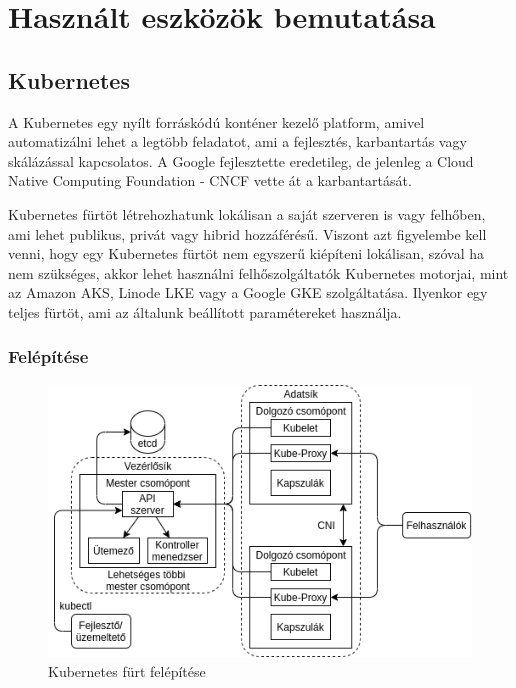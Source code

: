 \chapter{Használt eszközök bemutatása}

\section{Kubernetes}

A Kubernetes egy nyílt forráskódú konténer kezelő platform, amivel automatizálni
lehet a legtöbb feladatot, ami a fejlesztés, karbantartás vagy skálázással 
kapcsolatos. A Google fejlesztette eredetileg, de jelenleg a Cloud Native
Computing Foundation - CNCF vette át a karbantartását. 

Kubernetes fürtöt létrehozhatunk lokálisan a saját szerveren is vagy felhőben,
ami lehet publikus, privát vagy hibrid hozzáférésű. Viszont azt figyelembe 
kell venni, hogy egy Kubernetes fürtöt nem egyszerű kiépíteni lokálisan, 
szóval ha nem szükséges, akkor lehet használni felhőszolgáltatók Kubernetes 
motorjai, mint az Amazon AKS, Linode LKE vagy a Google GKE szolgáltatása.
Ilyenkor egy teljes fürtöt, ami az általunk beállított paramétereket használja.

\subsection{Felépítése}

\begin{figure}[!ht]
	\centering
	\includegraphics[width=1\textwidth, keepaspectratio]{figures/k8s_architecture.png}
	\caption{Kubernetes fürt felépítése}
	\label{fig:HVSpaces}
\end{figure}

